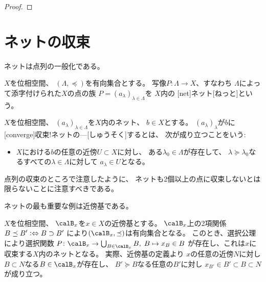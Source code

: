 \documentclass[report]{jlreq}
\begin{document}
\begin{proof}
    \TODO{}
\end{proof}

%
\section{ネットの収束}

ネットは点列の一般化である。

\begin{definition}[ネット]
    $X$を位相空間、
    $(\Lambda, \preceq)$を有向集合とする。
    写像$P \colon \Lambda \to X$、すなわち
    $\Lambda$によって添字付けられた$X$の点の族
    $P = (a_\lambda)_{\lambda \in \Lambda}$を
    $X$内の
    [net]{ネット}[ねっと]という。
\end{definition}

\begin{definition}[ネットの収束]
    $X$を位相空間、
    $(a_\lambda)_{\lambda \in \Lambda}$を$X$内のネット、
    $b \in X$とする。
    $(a_\lambda)_\lambda$が$b$に
    [converge]{収束!ネットの---}[しゅうそく]するとは、
    次が成り立つことをいう:
    \begin{itemize}
        \item $X$における$b$の任意の近傍$U \subset X$に対し、
            ある$\lambda_0 \in \Lambda$が存在して、
            $\lambda \succeq \lambda_0$なるすべての$\lambda \in \Lambda$に対して
            $a_\lambda \in U$となる。
    \end{itemize}
\end{definition}

\begin{remark}
    点列の収束のところで注意したように、
    ネットも2個以上の点に収束しないとは限らないことに注意すべきである。
\end{remark}

ネットの最も重要な例は近傍基である。

\begin{example}[近傍基により定まるネット]
    $X$を位相空間、
    $\calB_x$を$x \in X$の近傍基とする。
    $\calB_x$上の2項関係
    $B \preceq B' \vcentcolon\Leftrightarrow B \supset B'$
    により$(\calB_x, \preceq)$は有向集合となる。
    このとき、選択公理により選択関数
    $P \colon \calB_x \to \bigcup_{B \in \calB_x} B, \;
        B \mapsto x_B \in B$
    が存在し、これは$x$に収束する$X$内のネットとなる。
    実際、近傍基の定義より
    $x$の任意の近傍$N$に対し
    $B \subset N$なる$B \in \calB_x$が存在し、
    $B' \succeq B$なる任意の$B'$に対し
    $x_{B'} \in B' \subset B \subset N$が成り立つ。
\end{example}
\end{document}
